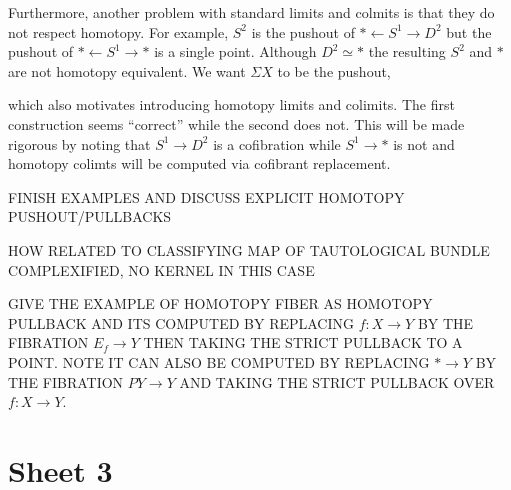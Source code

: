 \documentclass[12pt]{extarticle}
\begin{document}
\begin{rmk}
Furthermore, another problem with standard limits and colmits is that they do not respect homotopy. For example, $S^2$ is the pushout of $* \leftarrow S^1 \to D^2$ but the pushout of $* \leftarrow S^1 \to *$ is a single point. Although $D^2 \simeq *$ the resulting $S^2$ and $*$ are not homotopy equivalent. We want $\Sigma X$ to be the pushout,
\begin{center}
\end{center}
which also motivates introducing homotopy limits and colimits. The first construction seems ``correct'' while the second does not. This will be made rigorous by noting that $S^1 \to D^2$ is a cofibration while $S^1 \to *$ is not and homotopy colimts will be computed via cofibrant replacement.
\end{rmk}

FINISH EXAMPLES AND DISCUSS EXPLICIT HOMOTOPY PUSHOUT/PULLBACKS 



HOW RELATED TO CLASSIFYING MAP OF TAUTOLOGICAL BUNDLE COMPLEXIFIED, NO KERNEL IN THIS CASE



GIVE THE EXAMPLE OF HOMOTOPY FIBER AS HOMOTOPY PULLBACK AND ITS COMPUTED BY REPLACING $f : X \to Y$ BY THE FIBRATION $E_f \to Y$ THEN TAKING THE STRICT PULLBACK TO A POINT. NOTE IT CAN ALSO BE COMPUTED BY REPLACING $* \to Y$ BY THE FIBRATION $P Y \to Y$ AND TAKING THE STRICT PULLBACK OVER $f  : X \to Y$.


\section{Sheet 3}

\newcommand{\C}{\mathcal{C}}
\newcommand{\D}{\mathcal{D}}
\end{document}
